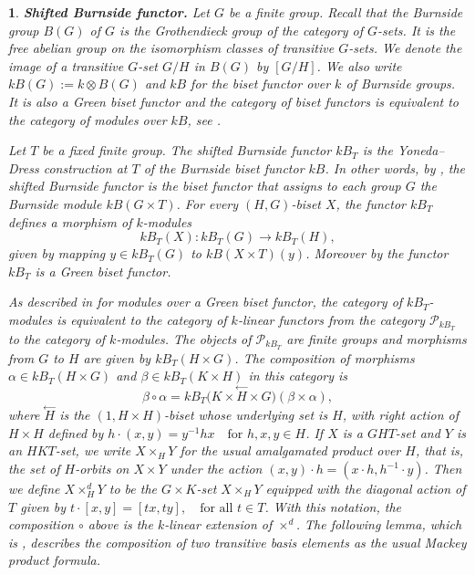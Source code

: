 \documentclass[12pt]{article}
\theoremstyle{change}
\newtheorem{nothing}[theorem]{}
\newcommand{\calP}{\mathcal{P}}
\newcommand{\1}{{\bf 1}}
\begin{document}
\begin{nothing}{\textbf{Shifted Burnside functor.}}
Let $G$ be a finite group. Recall that the Burnside group $B(G)$ of $G$ is the Grothendieck group of the category of $G$-sets. It is the free abelian group on the isomorphism classes of transitive $G$-sets. We denote the image of a transitive $G$-set $G/H$ in $B(G)$ by $[G/H]$. We also write $kB(G) := k\otimes B(G)$ and $kB$ for the biset functor over $k$ of Burnside groups. It is also a Green biset functor and the category of biset functors is equivalent to the category of modules over $kB$, see \cite[Section 8.5 \& 8.6]{B}. 

Let $T$ be a fixed finite group. The \emph{shifted Burnside functor} $kB_T$ is the Yoneda--Dress construction at $T$ of the Burnside biset functor $kB$. In other words, by \cite[Section 8.2]{B}, the shifted Burnside functor is the biset functor that assigns to each group $G$ the Burnside module $kB(G \times T)$. For every $(H,G)$-biset $X$, the functor $kB_T$ defines a morphism of $k$-modules
\[
kB_T(X) : kB_T(G) \longrightarrow kB_T(H),
\]
given by mapping $y \in kB_T(G)$ to $kB(X \times T)(y)$. Moreover by \cite[Lemma 4.4]{R1} the functor $kB_T$ is a Green biset functor. 

As described in \cite[Proposition 8.6.1]{B} for modules over a Green biset functor, the category of $kB_T$-modules is equivalent to the category of $k$-linear functors from the category $\calP_{kB_T}$ to the category of $k$-modules. The objects of $\calP_{kB_T}$ are finite groups and morphisms from $G$ to $H$ are given by $kB_T(H\times G)$. The composition of morphisms $\alpha \in kB_T(H \times G)$ and $\beta \in kB_T(K \times H)$ in this category is
$$\beta \circ \alpha = kB_T\bigl(K \times \overset{\leftarrow}{H} \times G\bigr)(\beta \times \alpha),$$
where $\overset{\leftarrow}{H}$ is the $(1, H \times H)$-biset whose underlying set is $H$, with right action of $H \times H$ defined by $h \cdot (x,y) = y^{-1} h x \quad \text{for } h, x,y \in H$. If $X$ is a $GHT$-set and $Y$ is an $HKT$-set, we write $X \times_H Y$ for the usual amalgamated product over $H$, that is, the set of $H$-orbits on $X \times Y$ under the action $(x,y)\cdot h = (x\cdot h, h^{-1}\cdot y)$.
Then we define $X \times_H^d Y$ to be the $G \times K$-set $X \times_H Y$ equipped with the diagonal action of $T$ given by $t \cdot [x,y] = [tx, ty], \quad \text{for all } t \in T$. With this notation, the composition $\circ$ above is the $k$-linear extension of $\times^d$. The following lemma, which is \cite[Lemma 4.5]{R2}, describes the composition of two transitive basis elements as the usual Mackey product formula.
\end{nothing}
\end{document}
